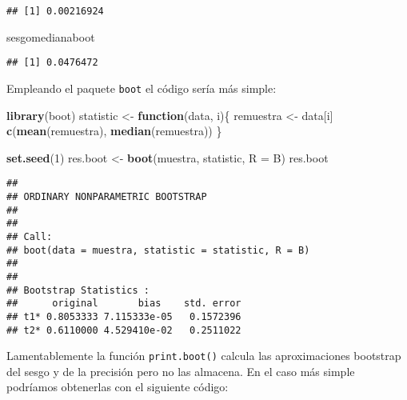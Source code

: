 \documentclass[]{book}
\newenvironment{Shaded}{\begin{snugshade}}{\end{snugshade}}
\newcommand{\KeywordTok}[1]{\textcolor[rgb]{0.13,0.29,0.53}{\textbf{#1}}}
\newcommand{\DataTypeTok}[1]{\textcolor[rgb]{0.13,0.29,0.53}{#1}}
\newcommand{\DecValTok}[1]{\textcolor[rgb]{0.00,0.00,0.81}{#1}}
\newcommand{\StringTok}[1]{\textcolor[rgb]{0.31,0.60,0.02}{#1}}
\newcommand{\OtherTok}[1]{\textcolor[rgb]{0.56,0.35,0.01}{#1}}
\newcommand{\ControlFlowTok}[1]{\textcolor[rgb]{0.13,0.29,0.53}{\textbf{#1}}}
\newcommand{\OperatorTok}[1]{\textcolor[rgb]{0.81,0.36,0.00}{\textbf{#1}}}
\newcommand{\NormalTok}[1]{#1}
\theoremstyle{break}
\theoremstyle{definition}
\theoremstyle{definition}
\theoremstyle{definition}
\theoremstyle{remark}
\begin{document}
\begin{verbatim}
## [1] 0.00216924
\end{verbatim}

\begin{Shaded}
\begin{Highlighting}[]
\NormalTok{sesgomedianaboot}
\end{Highlighting}
\end{Shaded}

\begin{verbatim}
## [1] 0.0476472
\end{verbatim}

Empleando el paquete \texttt{boot} el código sería más simple:

\begin{Shaded}
\begin{Highlighting}[]
\KeywordTok{library}\NormalTok{(boot)}
\NormalTok{statistic <-}\StringTok{ }\ControlFlowTok{function}\NormalTok{(data, i)\{}
\NormalTok{  remuestra <-}\StringTok{ }\NormalTok{data[i]}
  \KeywordTok{c}\NormalTok{(}\KeywordTok{mean}\NormalTok{(remuestra), }\KeywordTok{median}\NormalTok{(remuestra))}
\NormalTok{\}}

\KeywordTok{set.seed}\NormalTok{(}\DecValTok{1}\NormalTok{)}
\NormalTok{res.boot <-}\StringTok{ }\KeywordTok{boot}\NormalTok{(muestra, statistic, }\DataTypeTok{R =}\NormalTok{ B)}
\NormalTok{res.boot}
\end{Highlighting}
\end{Shaded}

\begin{verbatim}
## 
## ORDINARY NONPARAMETRIC BOOTSTRAP
## 
## 
## Call:
## boot(data = muestra, statistic = statistic, R = B)
## 
## 
## Bootstrap Statistics :
##      original       bias    std. error
## t1* 0.8053333 7.115333e-05   0.1572396
## t2* 0.6110000 4.529410e-02   0.2511022
\end{verbatim}

Lamentablemente la función \texttt{print.boot()} calcula las
aproximaciones bootstrap del sesgo y de la precisión pero no las
almacena. En el caso más simple podríamos obtenerlas con el siguiente
código:

\begin{Shaded}
\end{Shaded}
\end{document}
